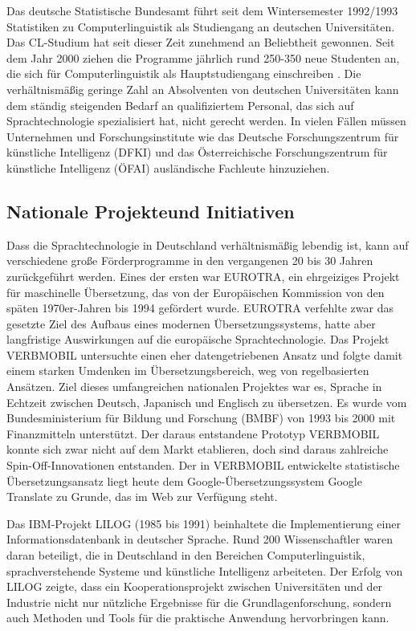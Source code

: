 \documentclass[]{../../metanetpaper}
\begin{document}
\begin{multicols}{2}
Das deutsche Statistische Bundesamt führt seit dem Wintersemester 1992/1993 Statistiken zu Computerlinguistik als Studiengang an deutschen Universitäten. Das CL-Stu\-dium hat seit dieser Zeit zunehmend an Beliebtheit gewonnen. Seit dem Jahr 2000 ziehen die Programme jährlich rund 250-350 neue Studenten an, die sich für Computerlinguistik als Hauptstudiengang einschreiben \cite{wie1}. Die verhältnismäßig geringe Zahl an Absolventen von deutschen Universitäten kann dem ständig steigenden Bedarf an qualifiziertem Personal, das sich auf Sprachtechnologie spezialisiert hat, nicht gerecht werden. In vielen Fällen müssen Unternehmen und Forschungsinstitute wie das Deutsche Forschungszentrum für künstliche Intelligenz (DFKI) und das Österreichische Forschungszentrum für künstliche Intelligenz (ÖFAI) ausländische Fachleute hinzuziehen.

\subsection[Nationale Projekte und Initiativen]{Nationale Projekte\newline und Initiativen}

Dass die Sprachtechnologie in Deutschland verhältnismäßig lebendig ist, kann auf verschiedene große Förderprogramme in den vergangenen 20 bis 30 Jahren zurückgeführt werden. Eines der ersten war EUROTRA, ein ehrgeiziges Projekt für maschinelle Übersetzung, das von der Europäischen Kommission von den späten 1970er-Jahren bis 1994 gefördert wurde. EUROTRA verfehlte zwar das gesetzte Ziel des Aufbaus eines modernen Übersetzungssystems, hatte aber langfristige Auswirkungen auf die europäische Sprachtechnologie. Das Projekt VERBMOBIL untersuchte einen eher datengetriebenen Ansatz und folgte damit einem starken Umdenken im Übersetzungsbereich, weg von regelbasierten Ansätzen. Ziel dieses umfangreichen nationalen Projektes war es, Sprache in Echtzeit zwischen Deutsch, Japanisch und Englisch zu übersetzen. Es wurde vom Bundesministerium für Bildung und Forschung (BMBF) von 1993 bis 2000 mit Finanzmitteln unterstützt. Der daraus entstandene Prototyp VERBMOBIL konnte sich zwar nicht auf dem Markt etablieren, doch sind daraus zahlreiche Spin-Off-In\-no\-va\-tio\-nen entstanden. Der in VERBMOBIL entwickelte statistische Übersetzungsansatz liegt heute dem Google-Über\-set\-zungs\-system Google Translate zu Grunde, das im Web zur Verfügung steht.

Das IBM-Projekt LILOG (1985 bis 1991) beinhaltete die Implementierung einer Informationsdatenbank in deutscher Sprache. Rund 200 Wissenschaftler waren daran beteiligt, die in Deutschland in den Bereichen Computerlinguistik, sprachverstehende Systeme und künstliche Intelligenz arbeiteten. Der Erfolg von LILOG zeigte, dass ein Kooperationsprojekt zwischen Universitäten und der Industrie nicht nur nützliche Ergebnisse für die Grundlagenforschung, sondern auch Methoden und Tools für die praktische Anwendung hervorbringen kann.


\end{multicols}
\end{document}
